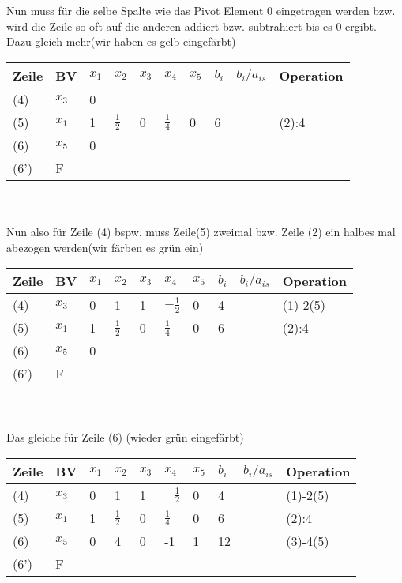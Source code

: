 \documentclass{article}
\begin{document}
Nun muss für die selbe Spalte wie das Pivot Element 0 eingetragen werden bzw. wird die Zeile so oft auf die anderen addiert bzw. subtrahiert bis es 0 ergibt. Dazu gleich mehr(wir haben es gelb eingefärbt)\\
\begin{tabular}{|l|l|l|l|l|l|l|l|l|l|}
	\hline
	Zeile & BV &$x_{1}$&$x_{2}$&$x_{3}$&$x_{4}$&$x_{5}$&$b_{i}$&$b_{i}/a_{is}$&Operation\\
	\hline
	(4)&$x_{3}$&\cellcolor{yellow}0&&&&&&&\\
	\hline
	(5)&$x_{1}$&1&$\frac{1}{2}$&0&$\frac{1}{4}$&0&6&&(2):4\\
	\hline
	(6)&$x_{5}$&\cellcolor{yellow}0&&&&&&&\\
	\hline
	(6')&F&&&&&&&&\\
	\hline
\end{tabular}\\\\
Nun also für Zeile (4) bspw. muss Zeile(5) zweimal bzw. Zeile (2) ein halbes mal abezogen werden(wir färben es grün ein)\\
\begin{tabular}{|l|l|l|l|l|l|l|l|l|l|}
	\hline
	Zeile & BV &$x_{1}$&$x_{2}$&$x_{3}$&$x_{4}$&$x_{5}$&$b_{i}$&$b_{i}/a_{is}$&Operation\\
	\hline
	(4)&$x_{3}$&\cellcolor{green}0&\cellcolor{green}1&\cellcolor{green}1&\cellcolor{green}$-\frac{1}{2}$&\cellcolor{green}0&\cellcolor{green}4&&(1)-2(5)\\
	\hline
	(5)&$x_{1}$&1&$\frac{1}{2}$&0&$\frac{1}{4}$&0&6&&(2):4\\
	\hline
	(6)&$x_{5}$&0&&&&&&&\\
	\hline
	(6')&F&&&&&&&&\\
	\hline
\end{tabular}\\\\
Das gleiche für Zeile (6) (wieder grün eingefärbt)\\
\begin{tabular}{|l|l|l|l|l|l|l|l|l|l|}
	\hline
	Zeile & BV &$x_{1}$&$x_{2}$&$x_{3}$&$x_{4}$&$x_{5}$&$b_{i}$&$b_{i}/a_{is}$&Operation\\
	\hline
	(4)&$x_{3}$&0&1&1&$-\frac{1}{2}$&0&4&&(1)-2(5)\\
	\hline
	(5)&$x_{1}$&1&$\frac{1}{2}$&0&$\frac{1}{4}$&0&6&&(2):4\\
	\hline
	(6)&$x_{5}$&\cellcolor{green}0&\cellcolor{green}4&\cellcolor{green}0&\cellcolor{green}-1&\cellcolor{green}1&\cellcolor{green}12&&(3)-4(5)\\
	\hline
	(6')&F&&&&&&&&\\
	\hline
\end{tabular}\\\\
\end{document}
